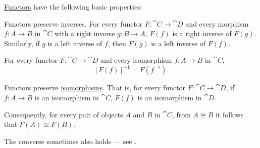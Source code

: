 \begin{proposition}\label{thm:def:functor/properties}
  \hyperref[def:functor]{Functors} have the following basic properties:
  \begin{thmenum}
     Functors preserve inverses. For every functor \( F: \cat{C} \to \cat{D} \) and every morphism \( f: A \to B \) in \( \cat{C} \) with a right inverse \( g: B \to A \), \( F(f) \) is a right inverse of \( F(g) \). Similarly, if \( g \) is a left inverse of \( f \), then \( F(g) \) is a left inverse of \( F(f) \).

     For every functor \( F: \cat{C} \to \cat{D} \) and every isomorphism \( f: A \to B \) in \( \cat{C} \),
    \begin{equation}\label{eq:thm:def:functor/properties/inverses}
      [F(f)]^{-1} = F(f^{-1}).
    \end{equation}

     Functors preserve \hyperref[def:morphism_invertibility/isomorphism]{isomorphisms}. That is, for every functor \( F: \cat{C} \to \cat{D} \), if \( f: A \to B \) is an isomorphism in \( \cat{C} \), \( F(f) \) is an isomorphism in \( \cat{D} \).

    Consequently, for every pair of objects \( A \) and \( B \) in \( \cat{C} \), from \( A \cong B \) it follows that \( F(A) \cong F(B) \).

    The converse sometimes also holds --- see .
  \end{thmenum}
\end{proposition}
